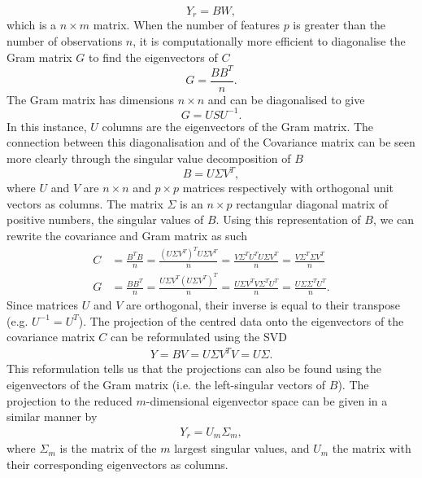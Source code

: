 \begin{equation}
Y_r = BW,
\end{equation}
which is a $n \times m$ matrix.
When the number of features $p$ is greater than the number of observations $n$, it is computationally more efficient to diagonalise the Gram matrix $G$ to find the eigenvectors of $C$
\begin{equation}
\label{eq:gram}
G = \frac{BB^T}{n}.
\end{equation}
The Gram matrix has dimensions $n \times n$ and can be diagonalised to give 
\begin{equation}
G = USU^{-1}.
\end{equation}
In this instance, $U$ columns are the eigenvectors of the Gram matrix. The connection between this diagonalisation and of the Covariance matrix can be seen more clearly through the singular value decomposition of $B$
\begin{equation}
B = U \Sigma V^T,
\end{equation}where $U$ and $V$ are $n \times n$ and $p \times p$ matrices respectively with orthogonal unit vectors as columns. The matrix $\Sigma$ is an $n \times p$ rectangular diagonal matrix of positive numbers, the singular values of $B$. Using this representation of $B$, we can rewrite the covariance and Gram matrix as such
\begin{align}
C &= \frac{B^TB}{n} = \frac{(U\Sigma V^T)^TU\Sigma V^T}{n} = \frac{V\Sigma^T U^TU\Sigma V^T}{n} = \frac{V \Sigma^T\Sigma V^T }{n} \\
G &= \frac{BB^T}{n} = \frac{U\Sigma V^T(U\Sigma V^T)^T}{n} = \frac{U\Sigma V^TV\Sigma^T U^T}{n} = \frac{U\Sigma \Sigma^T U^T}{n}.
\end{align}
Since matrices $U$ and $V$ are orthogonal,  their inverse is equal to their transpose (e.g. $U^{-1} = U^T$). The projection of the centred data onto the eigenvectors of the covariance matrix $C$ can be reformulated using the SVD
\begin{align}
Y = BV = U \Sigma V^T V = U \Sigma.
\end{align}
This reformulation tells us that the projections can also be found using the eigenvectors of the Gram matrix (i.e. the left-singular vectors of $B$). The projection to the reduced $m$-dimensional eigenvector space can be given in a similar manner by
\begin{align}
\label{eq:reducedGram}
Y_r = U_m \Sigma_m,
\end{align}
where $\Sigma_m$ is the matrix of the $m$ largest singular values, and $U_m$ the matrix with their corresponding eigenvectors as columns.

